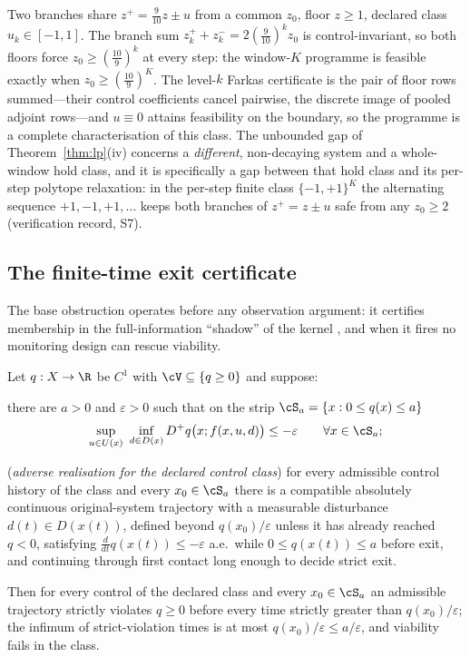\begin{example}\label{ex:relax-gap}
Two branches share $z^+=\tfrac9{10}z\pm u$ from a common $z_0$, floor $z\ge1$, declared class $u_k\in[-1,1]$. The branch sum $z^+_k+z^-_k=2(\tfrac9{10})^kz_0$ is control-invariant, so both floors force $z_0\ge(\tfrac{10}9)^k$ at every step: the window-$K$ programme is feasible exactly when $z_0\ge(\tfrac{10}9)^K$. The level-$k$ Farkas certificate is the pair of floor rows summed---their control coefficients cancel pairwise, the discrete image of pooled adjoint rows---and $u\equiv0$ attains feasibility on the boundary, so the programme is a complete characterisation of this class. The unbounded gap of Theorem~\ref{thm:lp}(iv) concerns a \emph{different}, non-decaying system and a whole-window hold class, and it is specifically a gap between that hold class and its per-step polytope relaxation: in the per-step finite class $\{-1,+1\}^K$ the alternating sequence $+1,-1,+1,\dots$ keeps both branches of $z^+=z\pm u$ safe from any $z_0\ge2$ (verification record, S7).
\end{example}

\subsection{The finite-time exit certificate}\label{sec:exit}

The base obstruction operates before any observation argument: it certifies membership in the full-information ``shadow'' of the kernel \citep{aubin2001,aubin2002}, and when it fires no monitoring design can rescue viability.

\begin{theorem}\label{thm:exit}
Let $q:X\to\R$ be $C^1$ with $\cV\subseteq\{q\ge0\}$ and suppose:
\begin{description}[leftmargin=2.6em,itemsep=1pt]
\item[\hyp{E1}] there are $a>0$ and $\varepsilon>0$ such that on the strip $\cS_a=\{x:0\le q(x)\le a\}$
\begin{equation}\label{eq:isaacs}
\sup_{u\in U(x)}\ \inf_{d\in D(x)}D^+q\bigl(x;f(x,u,d)\bigr)\le-\varepsilon\qquad\forall x\in\cS_a;
\end{equation}
\item[\hyp{E2}] (\emph{adverse realisation for the declared control class}) for every admissible control history of the class and every $x_0\in\cS_a$ there is a compatible absolutely continuous original-system trajectory with a measurable disturbance $d(t)\in D(x(t))$, defined beyond $q(x_0)/\varepsilon$ unless it has already reached $q<0$, satisfying $\frac{d}{dt}q(x(t))\le-\varepsilon$ a.e.\ while $0\le q(x(t))\le a$ before exit, and continuing through first contact long enough to decide strict exit.
\end{description}
Then for every control of the declared class and every $x_0\in\cS_a$ an admissible trajectory strictly violates $q\ge0$ before every time strictly greater than $q(x_0)/\varepsilon$; the infimum of strict-violation times is at most $q(x_0)/\varepsilon\le a/\varepsilon$, and viability fails in the class.
\end{theorem}

